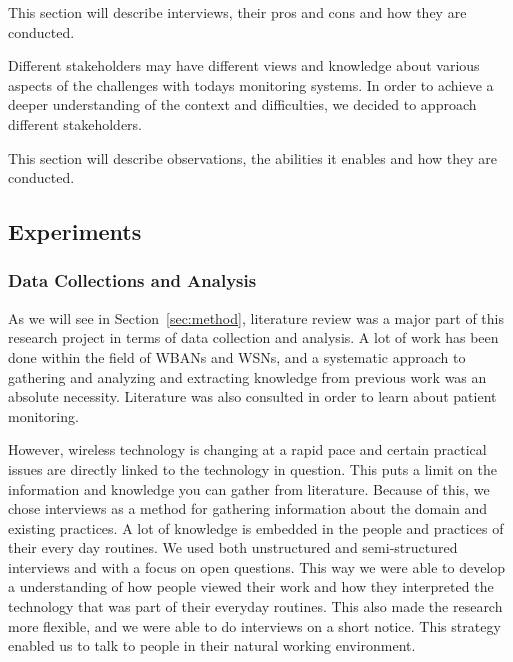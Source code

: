 
This section will describe interviews, their pros and cons and how they are conducted.

Different stakeholders may have different views and knowledge about various aspects of the challenges with todays monitoring systems. In order to achieve a deeper understanding of the context and difficulties, we decided to approach different stakeholders.


This section will describe observations, the abilities it enables and how they are conducted.

\subsection{Experiments} %
\label{sub:experiments}




\subsubsection{Data Collections and Analysis} %
\label{ssub:data_collections_and_analysis}

As we will see in Section~\ref{sec:method}, literature review was a major part of this research project in terms of data collection and analysis. A lot of work has been done within the field of WBANs and WSNs, and a systematic approach to gathering and analyzing and extracting knowledge from previous work was an absolute necessity. Literature was also consulted in order to learn about patient monitoring.

However, wireless technology is changing at a rapid pace and certain practical issues are directly linked to the technology in question. This puts a limit on the information and knowledge you can gather from literature. Because of this, we chose interviews as a method for gathering information about the domain and existing practices. A lot of knowledge is embedded in the people and practices of their every day routines. We used both unstructured and semi-structured interviews and with a focus on open questions. This way we were able to develop a understanding of how people viewed their work and how they interpreted the technology that was part of their everyday routines. This also made the research more flexible, and we were able to do interviews on a short notice. This strategy enabled us to talk to people in their natural working environment.


